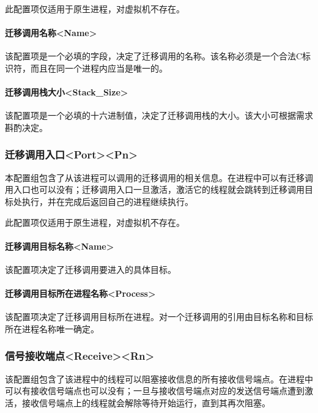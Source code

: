 此配置项仅适用于原生进程，对虚拟机不存在。

\paragraph{迁移调用名称<Name>{}}\label{par:5-3-14-17-1}

该配置项是一个必填的字段，决定了迁移调用的名称。该名称必须是一个合法C标识符，而且在同一个进程内应当是唯一的。

\paragraph{迁移调用栈大小<Stack\_Size>{}}\label{par:5-3-14-17-2}

该配置项是一个必填的十六进制值，决定了迁移调用栈的大小。该大小可根据需求斟酌决定。

\subsubsection{迁移调用入口<Port><Pn>{}}\label{subsubsec:5-3-14-18}

本配置组包含了从该进程可以调用的迁移调用的相关信息。在进程中可以有迁移调用入口也可以没有；迁移调用入口一旦激活，激活它的线程就会跳转到迁移调用目标处执行，并在完成后返回自己的进程继续执行。

此配置项仅适用于原生进程，对虚拟机不存在。

\paragraph{迁移调用目标名称<Name>{}}\label{par:5-3-14-18-1}

该配置项决定了迁移调用要进入的具体目标。

\paragraph{迁移调用目标所在进程名称<Process>{}}\label{par:5-3-14-18-2}

该配置项决定了迁移调用目标所在进程。对一个迁移调用的引用由目标名称和目标所在进程名称唯一确定。

\subsubsection{信号接收端点<Receive><Rn>{}}\label{subsubsec:5-3-14-19}

该配置组包含了该进程中的线程可以阻塞接收信息的所有接收信号端点。在进程中可以有接收信号端点也可以没有；一旦与接收信号端点对应的发送信号端点遭到激活，接收信号端点上的线程就会解除等待开始运行，直到其再次阻塞。

